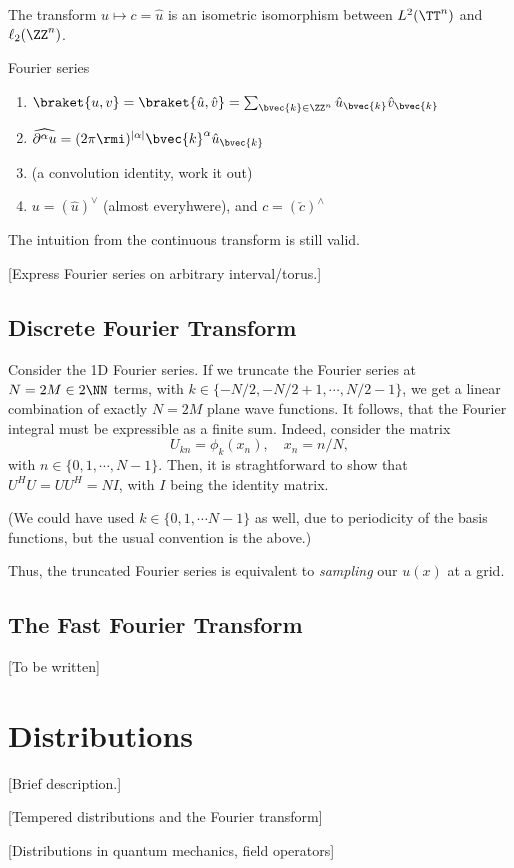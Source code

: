 The transform $u \mapsto c = \hat{u}$ is an isometric isomorphism between $L^2(\TT^n)$ and $\ell_2(\ZZ^n)$.

\begin{myTheorem}{Fourier series}{}
\begin{enumerate}
    \item $\braket{u,v} = \braket{\hat{u},\hat{v}} = \sum_{\bvec{k}\in\ZZ^n} \hat{u}_{\bvec{k}}\hat{v}_{\bvec{k}}$ 
    \item $\widehat{\partial^\alpha u} = (2\pi \rmi)^{|\alpha|} \bvec{k}^\alpha \hat{u}_{\bvec{k}}$ 
    \item (a convolution identity, work it out)
    \item $u = (\hat{u})^\vee$ (almost everyhwere), and $c = (\check{c})^\wedge$  
\end{enumerate}
\end{myTheorem}

The intuition from the continuous transform is still valid.

[Express Fourier series on arbitrary interval/torus.]


\subsection{Discrete Fourier Transform}

Consider the 1D Fourier series.
If we truncate the Fourier series at $N = 2M \in 2\NN$ terms, with $k \in \{-N/2, -N/2+1, \cdots, N/2-1\}$, we get a linear combination of exactly $N = 2M$ plane wave functions. It follows, that the Fourier integral must be expressible as a finite sum. Indeed, consider the matrix
\begin{equation}
    U_{kn} = \phi_k(x_n), \quad x_n = n/N, 
\end{equation}
with $n \in \{0, 1, \cdots, N-1\}$. Then, it is straghtforward to show that $U^H U = UU^H = N I$, with $I$ being the identity matrix.

(We could have used $k \in \{0, 1, \cdots N-1\}$ as well, due to periodicity of the basis functions, but the usual convention is the above.)

Thus, the truncated Fourier series is equivalent to \emph{sampling} our $u(x)$ at a grid.



\subsection{The Fast Fourier Transform}

[To be written]


\section{Distributions}

[Brief description.]

[Tempered distributions and the Fourier transform]

[Distributions in quantum mechanics, field operators]


